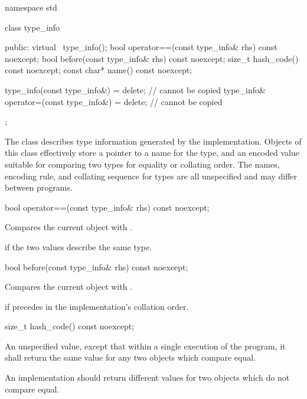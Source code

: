 %
\begin{codeblock}
namespace std {
  class type_info {
  public:
    virtual ~type_info();
    bool operator==(const type_info& rhs) const noexcept;
    bool before(const type_info& rhs) const noexcept;
    size_t hash_code() const noexcept;
    const char* name() const noexcept;

    type_info(const type_info&) = delete;                   // cannot be copied
    type_info& operator=(const type_info&) = delete;        // cannot be copied
  };
}
\end{codeblock}

\pnum
The class
describes type information generated by the implementation.
Objects of this class effectively store a pointer to a name for the type, and
an encoded value suitable for comparing two types for equality or collating order.
The names, encoding rule, and collating sequence for types are all unspecified
%
and may differ between programs.

%
\begin{itemdecl}
bool operator==(const type_info& rhs) const noexcept;
\end{itemdecl}

\begin{itemdescr}
\pnum
\effects
Compares the current object with .

\pnum
\returns
{}
if the two values describe the same type.
\end{itemdescr}

%
\begin{itemdecl}
bool before(const type_info& rhs) const noexcept;
\end{itemdecl}

\begin{itemdescr}
\pnum
\effects
Compares the current object with .

\pnum
\returns
{}
if
precedes  in the implementation's collation order.
\end{itemdescr}

%
\begin{itemdecl}
size_t hash_code() const noexcept;
\end{itemdecl}

\begin{itemdescr}
\pnum
\returns
An unspecified value, except that within a single execution of the
program, it shall return the same value for any two 
objects which compare equal.

\pnum
\remarks
An implementation should return different values for two
 objects which do not compare equal.
\end{itemdescr}


